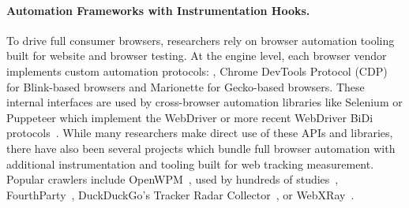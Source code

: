 \paragraph{Automation Frameworks with Instrumentation Hooks.} To drive full consumer browsers, researchers rely on browser automation tooling built for website and browser testing. At the engine level, each browser vendor implements custom automation protocols: \eg{}, Chrome DevTools Protocol (CDP) for Blink-based browsers and Marionette for Gecko-based browsers. These internal interfaces are used by cross-browser automation libraries like Selenium or Puppeteer which implement the WebDriver or more recent WebDriver BiDi protocols~\cite{cross-browser-testing-1-2020,cross-browser-testing-2-2021,puppeteer-support-firefox-2024}. While many researchers make direct use of these APIs and libraries, there have also been several projects which bundle full browser automation with additional instrumentation and tooling built for web tracking measurement. Popular crawlers include  OpenWPM~\cite{englehardtOnlineTracking1millionsite2016}, used by hundreds of studies~\cite{openwpm4StudiesUsing}, FourthParty~\cite{mayerFourthpartyFourthpartyFourthParty2011}, DuckDuckGo's Tracker Radar Collector~\cite{duckduckgoDuckduckgoTrackerradarcollectorModular2020}, or WebXRay~\cite{libertWebXrayPrivacySearch2024}.

